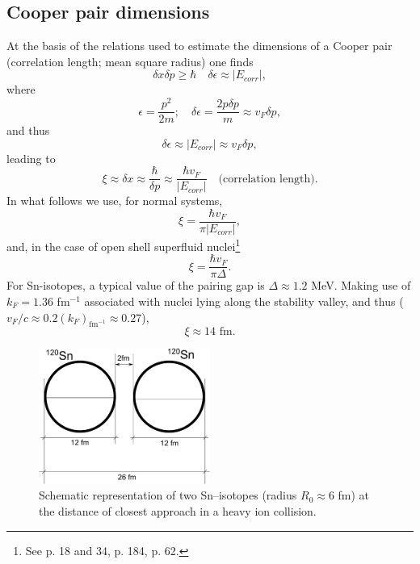 \subsection{Cooper pair dimensions}\label{S3.4.1}
 At the basis of the relations used to estimate  the dimensions of a Cooper pair (correlation length; mean square radius) one finds 
\begin{equation}
\delta x\delta p\ge \hbar\quad \delta\epsilon\approx |E_{corr}|,
\end{equation}
where
\begin{equation}
\epsilon=\frac{p^2}{2m};\quad\delta\epsilon=\frac{2p\delta p}{m}\approx v_F\delta p,
\end{equation}
and thus 
\begin{equation}
\delta\epsilon\approx  |E_{corr}|\approx v_F\delta p,
\end{equation}
leading to
\begin{equation}\label{eq3.4.9}
\xi\approx\delta x\approx\frac{\hbar}{\delta p}\approx \frac{\hbar v_F}{ |E_{corr}|}\quad \text{(correlation length)}.
\end{equation}
In what follows we use, for normal systems, 
\begin{equation}
\xi=\frac{\hbar v_F}{ \pi|E_{corr}|},
\end{equation}
and, in the case of open shell superfluid nuclei\footnote{See \cite{Schrieffer:64} p. 18 and 34, \cite{Leggett:06} p. 184, \cite{Annett:13} p. 62.}
\begin{equation}\label{eq4.5.11}
\xi=\frac{\hbar v_F}{ \pi\Delta}.
\end{equation}
For Sn-isotopes, a typical value of the pairing gap is $\Delta\approx 1.2$ MeV. Making use of $k_F=1.36$ fm$^{-1}$ associated with nuclei lying along the stability valley, and thus ($v_F/c\approx 0.2 (k_F)_{\text{fm}^{-1}}\approx0.27$),
\begin{equation}
\xi\approx14\text{ fm}.
\end{equation}
\begin{figure}
\centerline{\includegraphics*[width=0.5\textwidth,angle=0]{nutshell/figs/fig_1.pdf}}
\caption{Schematic representation of two Sn--isotopes (radius $R_0\approx 6$ fm) at the distance of closest approach in a heavy ion collision.}\label{fig_1}
\end{figure}


